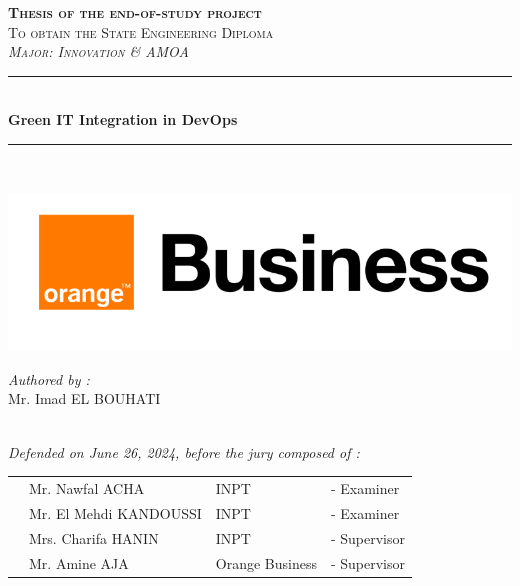 \vspace{0.9cm}
\begin{center}
{\large \textsc{\textbf{Thesis of the end-of-study project}}}\\[0.1cm]
{\large \textsc{To obtain the State Engineering Diploma}}\\[0.1cm]
{\large \textsc{\textit{Major: Innovation \& AMOA}}} \\[0.05cm] 
\vspace{-0.04cm}
\rule{\linewidth}{0.3mm} \\[0.4cm]   %
 { \huge \textbf{ Green IT Integration in DevOps }} \\[0.15cm] 
\rule{\linewidth}{0.3mm} \\[0.4cm]
\vspace{0.4cm}

\includegraphics[scale=0.28]{Logos/ob.png}  %

\vspace{1cm}

\noindent
\begin{minipage}{0.9\textwidth}
    \vspace{-7mm}
  \begin{flushleft} \large
    \emph{Authored by :}\\
    Mr. Imad \textsc{EL BOUHATI} %
  \end{flushleft}
\end{minipage}
\begin{minipage}{0.4\textwidth}

\end{minipage}\\[0.6cm]

{\large \textit{Defended on June 26, 2024, before the jury composed of :}}\\[0.5cm]


\begin{tabular}{p{1cm}lll}
 & \large Mr. Nawfal \textsc{ACHA}  & \large INPT & \large - Examiner \\[0.1cm]
 & \large Mr. El Mehdi \textsc{KANDOUSSI}  & \large INPT & \large - Examiner \\[0.1cm]
 & \large Mrs. Charifa \textsc{HANIN}  & \large INPT & \large - Supervisor \\[0.1cm]
  & \large Mr. Amine \textsc{AJA}  & \large Orange Business & \large - Supervisor \\[0.1cm]
 

\end{tabular}
\end{center}
